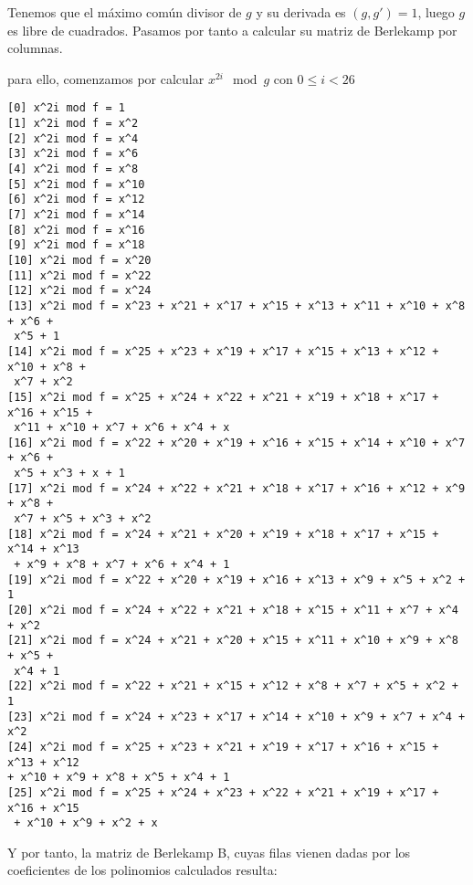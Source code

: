 \documentclass[a4paper]{article}
\begin{document}
Tenemos que el máximo común divisor de $g$ y su derivada es $(g, g')=1$, luego $g$ es libre de cuadrados. Pasamos por tanto a calcular su matriz de Berlekamp por columnas.

para ello, comenzamos por calcular $x^{2i} \mod g$ con $0\leq i < 26$

\begin{verbatim}
[0] x^2i mod f = 1
[1] x^2i mod f = x^2
[2] x^2i mod f = x^4
[3] x^2i mod f = x^6
[4] x^2i mod f = x^8
[5] x^2i mod f = x^10
[6] x^2i mod f = x^12
[7] x^2i mod f = x^14
[8] x^2i mod f = x^16
[9] x^2i mod f = x^18
[10] x^2i mod f = x^20
[11] x^2i mod f = x^22
[12] x^2i mod f = x^24
[13] x^2i mod f = x^23 + x^21 + x^17 + x^15 + x^13 + x^11 + x^10 + x^8 + x^6 +
 x^5 + 1
[14] x^2i mod f = x^25 + x^23 + x^19 + x^17 + x^15 + x^13 + x^12 + x^10 + x^8 +
 x^7 + x^2
[15] x^2i mod f = x^25 + x^24 + x^22 + x^21 + x^19 + x^18 + x^17 + x^16 + x^15 +
 x^11 + x^10 + x^7 + x^6 + x^4 + x
[16] x^2i mod f = x^22 + x^20 + x^19 + x^16 + x^15 + x^14 + x^10 + x^7 + x^6 +
 x^5 + x^3 + x + 1
[17] x^2i mod f = x^24 + x^22 + x^21 + x^18 + x^17 + x^16 + x^12 + x^9 + x^8 +
 x^7 + x^5 + x^3 + x^2
[18] x^2i mod f = x^24 + x^21 + x^20 + x^19 + x^18 + x^17 + x^15 + x^14 + x^13
 + x^9 + x^8 + x^7 + x^6 + x^4 + 1
[19] x^2i mod f = x^22 + x^20 + x^19 + x^16 + x^13 + x^9 + x^5 + x^2 + 1
[20] x^2i mod f = x^24 + x^22 + x^21 + x^18 + x^15 + x^11 + x^7 + x^4 + x^2
[21] x^2i mod f = x^24 + x^21 + x^20 + x^15 + x^11 + x^10 + x^9 + x^8 + x^5 +
 x^4 + 1
[22] x^2i mod f = x^22 + x^21 + x^15 + x^12 + x^8 + x^7 + x^5 + x^2 + 1
[23] x^2i mod f = x^24 + x^23 + x^17 + x^14 + x^10 + x^9 + x^7 + x^4 + x^2
[24] x^2i mod f = x^25 + x^23 + x^21 + x^19 + x^17 + x^16 + x^15 + x^13 + x^12 
+ x^10 + x^9 + x^8 + x^5 + x^4 + 1
[25] x^2i mod f = x^25 + x^24 + x^23 + x^22 + x^21 + x^19 + x^17 + x^16 + x^15
 + x^10 + x^9 + x^2 + x
\end{verbatim}

Y por tanto, la matriz de Berlekamp B, cuyas filas vienen dadas por los coeficientes de los polinomios calculados resulta:
\end{document}
